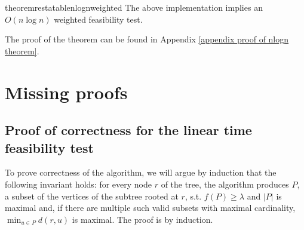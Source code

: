 \documentclass[a4paper,UKenglish]{lipics-v2016}
\theoremstyle{plain}
\begin{document}
\begin{restatable}{theoremrestatable}{nlognweighted}
\label{nlogn weighted f.t. theorem}
The above implementation implies an $O(n \log n)$ weighted feasibility test.
\end{restatable}
The proof of the theorem can be found in Appendix \ref{appendix proof of nlogn theorem}.



\newpage
\appendix

\section{Missing proofs}

\subsection{Proof of correctness for the linear time feasibility test}\label{appendix proof of correctness for linear f.t.}

To prove correctness of the algorithm, we will argue by induction that the following invariant holds: for every node $r$ of the tree, the algorithm
produces $P$, a subset of the vertices of the subtree rooted at $r$, s.t. $f(P)\geq\lambda$ and $|P|$ is maximal and, if there are multiple
such valid subsets with maximal cardinality, $\min_{u\in P} d(r,u)$ is maximal. The proof is by induction.
\end{document}
